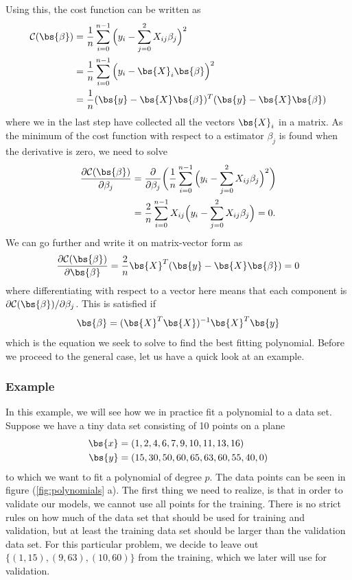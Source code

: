 Using this, the cost function can be written as
\begin{align}
\mathcal{C}(\bs{\beta})&=\frac{1}{n}\sum_{i=0}^{n-1}\Big(y_i-\sum_{j=0}^2X_{ij}\beta_j\Big)^2\notag\\
&=\frac{1}{n}\sum_{i=0}^{n-1}\Big(y_i-\bs{X}_i\bs{\beta}\Big)^2\label{eq:costols}\\
&=\frac{1}{n}(\bs{y}-\bs{X}\bs{\beta})^T(\bs{y}-\bs{X}\bs{\beta})\notag
\end{align}
where we in the last step have collected all the vectors $\bs{X}_i$ in a matrix. As the minimum of the cost function with respect to a estimator $\beta_j$ is found when the derivative is zero, we need to solve
\begin{align*}
\frac{\partial \mathcal{C}(\bs{\beta})}{\partial\beta_j} &=\frac{\partial}{\partial\beta_j}\bigg(\frac{1}{n}\sum_{i=0}^{n-1}\Big(y_i-\sum_{j=0}^2X_{ij}\beta_j\Big)^2\bigg)\notag\label{eq:gh}\\
&=\frac{2}{n}\sum_{i=0}^{n-1}X_{ij}\Big(y_i-\sum_{j=0}^2X_{ij}\beta_j\Big)=0.
\end{align*}
We can go further and write it on matrix-vector form as
\begin{equation*}
\frac{\partial \mathcal{C}(\bs{\beta})}{\partial\bs{\beta}}=\frac{2}{n}\bs{X}^T(\bs{y}-\bs{X}\bs{\beta})=0
\end{equation*}
where differentiating with respect to a vector here means that each component is $\partial\mathcal{C(\bs{\beta})}/\partial\beta_j$. This is satisfied if
\begin{equation}
\bs{\beta}=(\bs{X}^T\bs{X})^{-1}\bs{X}^T\bs{y}
\label{eq:polynomialestimators}
\end{equation}
which is the equation we seek to solve to find the best fitting polynomial. Before we proceed to the general case, let us have a quick look at an example.

\subsubsection{Example} \label{sec:example}
In this example, we will see how we in practice fit a polynomial to a data set. Suppose we have a tiny data set consisting of 10 points on a plane
\begin{align}
\bs{x}&=(1,2,4,6,7,9,10,11,13,16)\notag\\
\bs{y}&=(15,30,50,60,65,63,60,55,40,0)
\label{eq:datapoints}
\end{align}
to which we want to fit a polynomial of degree $p$. The data points can be seen in figure (\ref{fig:polynomials} a). The first thing we need to realize, is that in order to validate our models, we cannot use all points for the training. There is no strict rules on how much of the data set that should be used for training and validation, but at least the training data set should be larger than the validation data set. For this particular problem, we decide to leave out $\{(1,15),(9,63),(10,60)\}$ from the training, which we later will use for validation.

